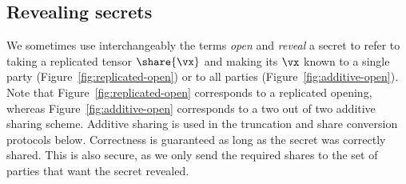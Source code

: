 \subsection{Revealing secrets}

We sometimes use interchangeably the terms \textit{open} and \textit{reveal} a secret to refer to taking a replicated tensor $\share{\vx}$ and making its $\vx$ known to a single party  (Figure~\ref{fig:replicated-open}) or to all parties (Figure~\ref{fig:additive-open}).
Note that Figure~\ref{fig:replicated-open} corresponds to a replicated opening, whereas Figure~\ref{fig:additive-open} corresponds to a two out of two additive sharing scheme. Additive sharing is used in the truncation and share conversion protocols below. Correctness is guaranteed as long as
the secret was correctly shared. This is also secure, as we only send the required
shares to the set of parties that want the secret revealed.

